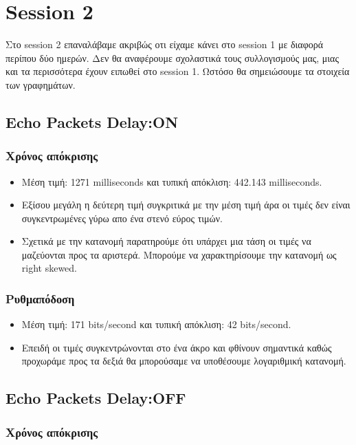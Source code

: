\documentclass[hidelinks, 12pt, a4paper]{article}
\begin{document}
\pagebreak
\section{Session 2}

Στο session 2 επαναλάβαμε ακριβώς οτι είχαμε κάνει στο session 1 με διαφορά περίπου δύο ημερών. Δεν θα αναφέρουμε σχολαστικά τους συλλογισμούς μας, μιας και τα περισσότερα έχουν ειπωθεί στο session 1. Ωστόσο θα σημειώσουμε τα στοιχεία των γραφημάτων.

\subsection{Echo Packets Delay:ON}
\subsubsection{Χρόνος απόκρισης}
\begin{itemize}
    \item Μέση τιμή: 1271 milliseconds και τυπική απόκλιση: 442.143 milliseconds.
    \item Εξίσου μεγάλη η δεύτερη τιμή συγκριτικά με την μέση τιμή άρα οι τιμές δεν είναι συγκεντρωμένες γύρω απο ένα στενό εύρος τιμών.
    \item Σχετικά με την κατανομή παρατηρούμε ότι υπάρχει μια τάση οι τιμές να μαζεύονται προς τα αριστερά. Μπορούμε να χαρακτηρίσουμε την κατανομή ως right skewed.
\end{itemize}

\subsubsection{Ρυθμαπόδοση}

\begin{itemize}
    \item Μέση τιμή: 171 bits/second και τυπική απόκλιση: 42 bits/second.
    \item Επειδή οι τιμές συγκεντρώνονται στο ένα άκρο και φθίνουν σημαντικά καθώς προχωράμε προς τα δεξιά θα μπορούσαμε να υποθέσουμε λογαριθμική κατανομή.
\end{itemize}

\subsection{Echo Packets Delay:OFF}
\subsubsection{Χρόνος απόκρισης}
\end{document}
